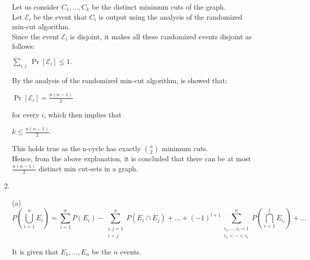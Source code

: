 \documentclass{article}
\begin{document}
\begin{enumerate}
    \textnormal{Let us consider $C_1, ...,C_k$ be the distinct minimum cuts of the graph.}\\
    \textnormal{Let $\mathcal{E}_i$ be the event that $C_i$ is output using the analysis of the randomized min-cut algorithm.}\\
    \textnormal{Since the event $\mathcal{E}_i$ is disjoint, it makes all these randomized events disjoint as follows:}\\
    \begin{center}
        $\sum_{i,j} \ \Pr[\mathcal{E}_i] \leq 1.$
    \end{center}
    \textnormal{By the analysis of the randomized min-cut algorithm, is showed that:}\\
    \begin{center}
        $\Pr[\mathcal{E}_i] = \frac{n(n-1)}{2}$
    \end{center}
    \textnormal{for every $i$, which then implies that}\\
    \begin{center}
        $k \leq \frac{n(n-1)}{2}.$
    \end{center}
    \textnormal{This holds true as the n-cycle has exactly $\binom{n}{2}$ minimum cuts.}\\
    \textnormal{Hence, from the above explanation, it is concluded that there can be at most $\frac{n(n-1)}{2}$ distinct min cut-sets in a graph.}\\
\newpage
\item
\item[(a)]\begin{equation*}
  P\left(\bigcup_{i=1}^{n} E_i\right) = \sum_{i=1}^{n} P(E_i) - \sum_{\substack{i,j=1 \\ i < j}}^{n} P(E_i \cap E_j) + \ldots + (-1)^{l+1} \sum_{\substack{i_1,\ldots,i_l=1 \\ i_1 < \cdots < i_l}}^{n} P\left(\bigcap_{r=1}^{l} E_{i_r}\right) + \ldots
  \end{equation*}
  
  It is given that \( E_1, \ldots, E_n \) be the \( n \) events.
  

\end{enumerate}
\end{document}
